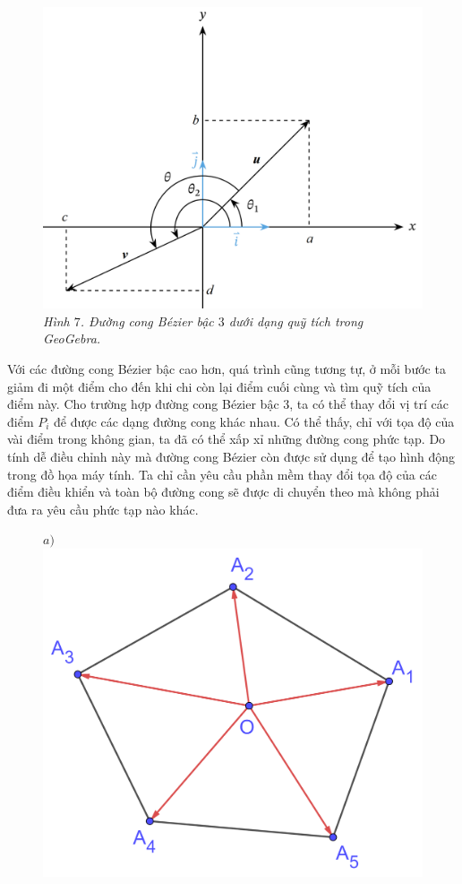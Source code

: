 \begin{multicols}{2}
		\begin{figure}[H]
			\vspace*{-5pt}
			\centering
			\captionsetup{labelformat= empty, justification=centering}
			\includegraphics[width= 0.8\linewidth]{11}
			\caption{\small\textit{\color{toanhocdoisong}Hình $7$. Đường cong Bézier bậc $3$ dưới dạng quỹ tích trong GeoGebra.}}
			\vspace*{-10pt}
		\end{figure}
		Với các đường cong Bézier bậc cao hơn, quá trình cũng tương tự, ở mỗi bước ta giảm đi một điểm cho đến khi chi còn lại điểm cuối cùng và tìm quỹ tích của điểm này.
		\vskip 0.1cm
		Cho trường hợp đường cong Bézier bậc $3$, ta có thể thay đổi vị trí các điểm $P_i$ để được các dạng đường cong khác nhau. Có thể thấy, chỉ với tọa độ của vài điểm trong không gian, ta đã có thể xấp xỉ những đường cong phức tạp. Do tính dễ điều chỉnh này mà đường cong Bézier còn được sử dụng để tạo hình động trong đồ họa máy tính. Ta chỉ cần yêu cầu phần mềm thay đổi tọa độ của các điểm điều khiển và toàn bộ đường cong sẽ được di chuyển theo mà không phải đưa ra yêu cầu phức tạp nào khác.
		\begin{figure}[H]
			\vspace*{-5pt}
			\centering
			\captionsetup{labelformat= empty, justification=centering}
			$a)$\includegraphics[width= 0.83\linewidth]{12}

\end{figure}
\end{multicols}
